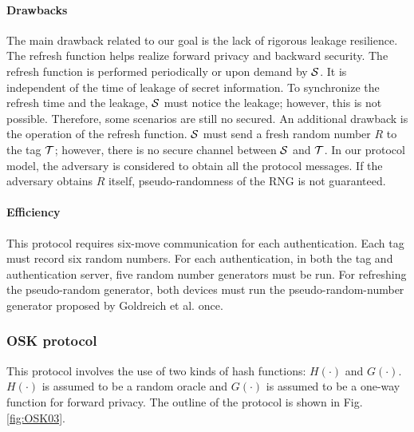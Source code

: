 \documentclass[english]{llncs}
\begin{document}
\paragraph{Drawbacks}

The main drawback related to our goal is the lack of rigorous leakage
resilience. The refresh function helps realize forward privacy and
backward security. The refresh function is performed periodically
or upon demand by ${\cal S}$. It is independent of the time of leakage
of secret information. To synchronize the refresh time and the leakage,
${\cal S}$ must notice the leakage; however, this is not possible.
Therefore, some scenarios are still no secured. An additional drawback
is the operation of the refresh function. ${\cal S}$ must send a
fresh random number $R$ to the tag ${\cal T}$; however, there is
no secure channel between ${\cal S}$ and ${\cal T}$. In our protocol
model, the adversary is considered to obtain all the protocol messages.
If the adversary obtains $R$ itself, pseudo-randomness of the RNG
is not guaranteed.


\paragraph{Efficiency}

This protocol requires six-move communication for each authentication.
Each tag must record six random numbers. For each authentication,
in both the tag and authentication server, five random number generators
must be run. For refreshing the pseudo-random generator, both devices
must run the pseudo-random-number generator proposed by Goldreich
et al. once.


\subsubsection{OSK protocol}

This protocol involves the use of two kinds of hash functions: $H(\cdot)$
and $G(\cdot)$. $H(\cdot)$ is assumed to be a random oracle and
$G(\cdot)$ is assumed to be a one-way function for forward privacy.
The outline of the protocol is shown in Fig. \ref{fig:OSK03}.

%
\end{document}
